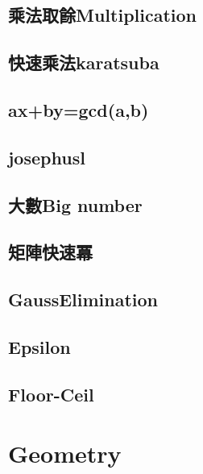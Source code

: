 \subsection{乘法取餘Multiplication}


\subsection{快速乘法karatsuba}


\subsection{ax+by=gcd(a,b)}


\subsection{josephusl}


\subsection{大數Big number}


\subsection{矩陣快速冪}


\subsection{GaussElimination}


\subsection{Epsilon}


\subsection{Floor-Ceil}


\section{Geometry}

